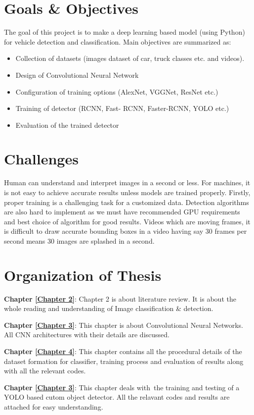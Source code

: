 \section{Goals \& Objectives}

The goal of this project is to make a deep learning based model (using Python) for vehicle detection and classification. Main objectives are summarized as:
\begin{itemize}
\item Collection of datasets (images dataset of car, truck classes etc. and videos).
\item Design of Convolutional Neural Network
\item Configuration of training options (AlexNet, VGGNet, ResNet etc.)
\item Training of detector (RCNN, Fast- RCNN, Faster-RCNN, YOLO etc.)
\item Evaluation of the trained detector
\end{itemize}

\section{Challenges}

Human can understand and interpret images in a 
second or less. For machines, it is not easy to achieve 
accurate results unless models are trained properly. Firstly, proper 
training is a challenging task for a customized data. Detection 
algorithms are also hard to implement as we must have recommended 
GPU requirements and best choice of algorithm for good results. Videos 
which are moving frames, it is difficult to draw accurate bounding boxes 
in a video having say 30 frames per second 
means 30 images are splashed in a second. 	


\section{Organization of Thesis}

\textbf{Chapter \ref{Chapter 2}}: Chapter 2 is about literature review. It is about
the whole reading and understanding of Image classification \& detection.

\noindent\textbf{Chapter \ref{Chapter 3}}: This chapter is about Convolutional Neural Networks. All CNN architectures with their details
are discussed.

\noindent\textbf{Chapter \ref{Chapter 4}}: This chapter contains all
the procedural details of the dataset formation for classifier,
training process and evaluation of results along with all the relevant codes.

\noindent\textbf{Chapter \ref{Chapter 3}}: This chapter deals with\
the training and testing of a YOLO based cutom object detector.
All the relavant codes and results are attached for easy understanding.
